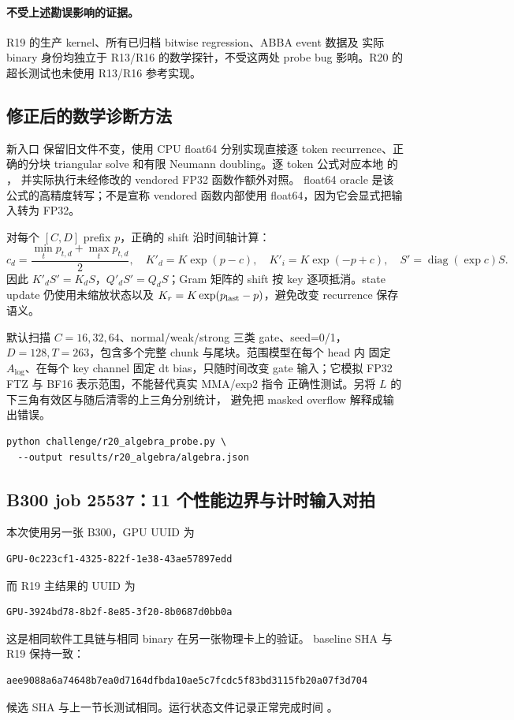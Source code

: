 \paragraph{不受上述勘误影响的证据。}
R19 的生产 kernel、所有已归档 bitwise regression、ABBA event 数据及
实际 binary 身份均独立于 R13/R16 的数学探针，不受这两处 probe bug
影响。R20 的超长测试也未使用 R13/R16 参考实现。

\subsection{修正后的数学诊断方法}

新入口  保留旧文件不变，使用
CPU float64 分别实现直接逐 token recurrence、正确的分块 triangular
solve 和有限 Neumann doubling。逐 token 公式对应本地
 的 ，
并实际执行未经修改的 vendored FP32 函数作额外对照。
float64 oracle 是该公式的高精度转写；不是宣称 vendored 函数内部使用
float64，因为它会显式把输入转为 FP32。

对每个 $[C,D]$ prefix $p$，正确的 shift 沿时间轴计算：
\[
 c_d=\frac{\min_t p_{t,d}+\max_t p_{t,d}}2,
 \quad K'_d=K\exp(p-c),\quad K'_i=K\exp(-p+c),
 \quad S'=\operatorname{diag}(\exp c)S.
\]
因此 $K'_dS'=K_dS$，$Q'_dS'=Q_dS$；Gram 矩阵的 shift 按 key
逐项抵消。state update 仍使用未缩放状态以及
$K_r=K\exp(p_{\rm last}-p)$，避免改变 recurrence 保存语义。

默认扫描 $C=16,32,64$、normal/weak/strong 三类 gate、seed=0/1，
$D=128,T=263$，包含多个完整 chunk 与尾块。范围模型在每个 head 内
固定 $A_{\log}$、在每个 key channel 固定 dt bias，只随时间改变 gate
输入；它模拟 FP32 FTZ 与 BF16 表示范围，不能替代真实 MMA/exp2 指令
正确性测试。另将 $L$ 的下三角有效区与随后清零的上三角分别统计，
避免把 masked overflow 解释成输出错误。

\begin{lstlisting}
python challenge/r20_algebra_probe.py \
  --output results/r20_algebra/algebra.json
\end{lstlisting}

\subsection{B300 job 25537：11 个性能边界与计时输入对拍}

本次使用另一张 B300，GPU UUID 为
\begin{lstlisting}
GPU-0c223cf1-4325-822f-1e38-43ae57897edd
\end{lstlisting}
而 R19 主结果的 UUID 为
\begin{lstlisting}
GPU-3924bd78-8b2f-8e85-3f20-8b0687d0bb0a
\end{lstlisting}
这是相同软件工具链与相同 binary 在另一张物理卡上的验证。
baseline SHA 与 R19 保持一致：
\begin{lstlisting}
aee9088a6a74648b7ea0d7164dfbda10ae5c7fcdc5f83bd3115fb20a07f3d704
\end{lstlisting}
候选 SHA 与上一节长测试相同。运行状态文件记录正常完成时间
。

